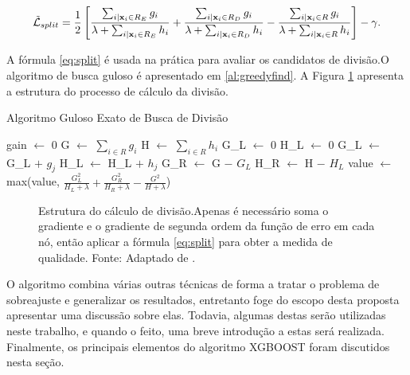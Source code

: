 \begin{equation}\label{eq:split}
\mathcal{\tilde{L}}_{split}=\frac{1}{2}\left[\frac{\sum_{i|{\bf x}_i\in R_E}g_i}{\lambda+\sum_{i|{\bf x}_i\in R_E}h_i}+\frac{\sum_{i|{\bf x}_i\in R_D}g_i}{\lambda+\sum_{i|{\bf x}_i\in R_D}h_i}-\frac{\sum_{i|{\bf x}_i\in R}g_i}{\lambda+\sum_{i|{\bf x}_i\in R}h_i}\right]-\gamma\mbox{.}
\end{equation}

A fórmula \eqref{eq:split} é usada na prática para avaliar os candidatos de divisão.O algoritmo de busca guloso é apresentado em \ref{al:greedyfind}. A Figura \ref{fig:structscore} apresenta a estrutura do processo de cálculo da divisão.

\begin{algorithm}
\caption{Algoritmo Guloso Exato de Busca de Divisão}\label{al:greedyfind}
\begin{algorithmic}[1]

\State gain $\gets$ 0
\State G $\gets$ $\sum_{i\in R}g_i$
\State H $\gets$ $\sum_{i\in R}h_i$
    \State G\_L $\gets$ 0
    \State H\_L $\gets$ 0
        \State G\_L $\gets$ G\_L $+$ $g_j$
        \State H\_L $\gets$ H\_L $+$ $h_j$
        \State G\_R $\gets$ G $-$ $G_L$
        \State H\_R $\gets$ H $-$ $H_L$
        \State value $\gets$ max(value, $\frac{G_L^2}{H_L+\lambda}+\frac{G_R^2}{H_R+\lambda}-\frac{G^2}{H+\lambda}$)
    \EndFor
\EndFor
\end{algorithmic}
\end{algorithm}

\begin{figure}[H]
\centering
{}
\caption{Estrutura do cálculo de divisão.Apenas é necessário soma o gradiente e o gradiente de segunda ordem da função de erro em cada nó, então aplicar a fórmula \eqref{eq:split} para obter a medida de qualidade. Fonte: Adaptado de \cite{CHEN:2016}.}
\label{fig:structscore}
\end{figure}

O algoritmo combina várias outras técnicas de forma a tratar o problema de sobreajuste e generalizar os resultados, entretanto foge do escopo desta proposta apresentar uma discussão sobre elas. Todavia, algumas destas serão utilizadas neste trabalho, e quando o feito, uma breve introdução a estas será realizada. Finalmente, os principais elementos do algoritmo XGBOOST foram discutidos nesta seção.














